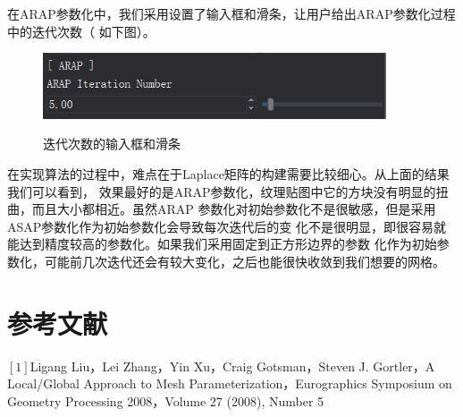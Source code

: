 \documentclass{article}
\begin{document}
	在ARAP参数化中，我们采用设置了输入框和滑条，让用户给出ARAP参数化过程中的迭代次数（
	如下图）。
	\begin{figure}[htb]
		\caption{\label{table.label} 迭代次数的输入框和滑条} \centering
		\begin{center}
			\includegraphics[width=4in]{iternum.jpg}
			\label{figure.label}
		\end{center}
	\end{figure}
	
	在实现算法的过程中，难点在于Laplace矩阵的构建需要比较细心。从上面的结果我们可以看到，
	效果最好的是ARAP参数化，纹理贴图中它的方块没有明显的扭曲，而且大小都相近。虽然ARAP
	参数化对初始参数化不是很敏感，但是采用ASAP参数化作为初始参数化会导致每次迭代后的变
	化不是很明显，即很容易就能达到精度较高的参数化。如果我们采用固定到正方形边界的参数
	化作为初始参数化，可能前几次迭代还会有较大变化，之后也能很快收敛到我们想要的网格。
\section{参考文献}
  $[1]$Ligang Liu，Lei Zhang，Yin Xu，Craig Gotsman，Steven J. Gortler，A 
  Local/Global Approach to Mesh Parameterization，Eurographics Symposium on 
  Geometry Processing 2008，Volume 27 (2008), Number 5
\end{document}
